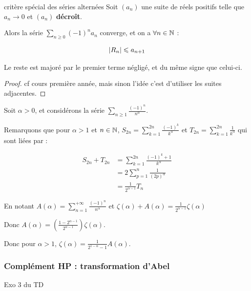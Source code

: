 \begin{theoreme}{critère spécial des séries alternées}{}
    Soit $(a_n)$ une suite de réels positifs telle que $a_n \longrightarrow 0$ et $(a_n)$ \textbf{décroît}. 

    Alors la série $\sum_{n \geqslant 0} (-1)^n a_n$ converge, et on a $\forall n \in \mathbb{N}$ : 

    $$\left|R_n\right| \leqslant a_{n + 1}$$

    Le reste est majoré par le premier terme négligé, et du même signe que celui-ci.
\end{theoreme}

\begin{proof}
    cf cours première année, mais sinon l'idée c'est d'utiliser les suites adjacentes. 
\end{proof}


\begin{exemple}
    Soit $\alpha > 0$, et considérons la série $\sum_{n \geqslant 1} \frac{(-1)^n }{n^\alpha}$.

    Remarquons que pour $\alpha > 1$ et $n \in \mathbb{N}$, $\displaystyle S_{2n} = \sum_{k = 1}^{2n} \frac{(-1)^k}{k^\alpha}$ et 
    $\displaystyle T_{2n} = \sum_{k = 1 }^{2n} \frac{1}{k^\alpha}$ qui sont liées par : 

    \begin{align*}
        S_{2n} + T_{2n} & = \sum_{k = 1}^{2n} \frac{(-1)^k + 1}{k^\alpha} \\
                        & = 2 \sum_{p = 1}^{n} \frac{1}{(2p)^\alpha} \\
                        & = \frac{1}{2^{\alpha - 1}} T_n 
    \end{align*}

    En notant $\displaystyle A(\alpha) = \sum_{n = 1}^{+\infty} \frac{(-1)^n}{n^\alpha}$ et $\displaystyle \zeta(\alpha) + A(\alpha) = \frac{1}{2^{\alpha - 1}} \zeta(\alpha)$

    Donc $A(\alpha) = \left( \frac{1 - 2^{\alpha - 1}}{2^{\alpha - 1}} \right) \zeta(\alpha)$.

    Donc pour $\alpha > 1$, $\displaystyle \zeta(\alpha) = \frac 1 {2^{1 - \alpha} - 1} A(\alpha)$.
\end{exemple}


\subsubsection{Complément HP : transformation d'Abel }


Exo 3 du TD 

